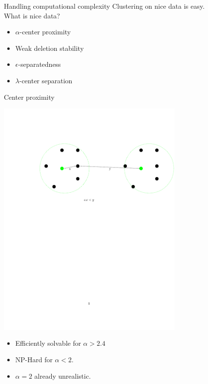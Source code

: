 \documentclass{beamer}
\begin{document}
\begin{frame}{Handling computational complexity}
	Clustering on {\color{green}nice} data is {easy}.\\
	\vspace{1cm}What is nice data?
	\begin{itemize}
		\vspace{0.3cm}\item $\alpha$-center proximity
		\vspace{0.3cm}\item Weak deletion stability
		\vspace{0.3cm}\item $\epsilon$-separatedness
		\vspace{0.3cm}\item $\lambda$-center separation		
	\end{itemize}
\end{frame}

\begin{frame}{Center proximity}
	\begin{center}
	\includegraphics[trim={120 430 0 120},clip,width=0.7\textwidth]{figures/alphacp.pdf}
	\end{center}
	
	\begin{itemize}
		\item Efficiently solvable for $\alpha > 2.4$
		\item NP-Hard for $\alpha < 2$.
		\vspace{0.5cm}\item $\alpha = 2$ already \alert{unrealistic}.
	\end{itemize}
\end{frame}
\end{document}
